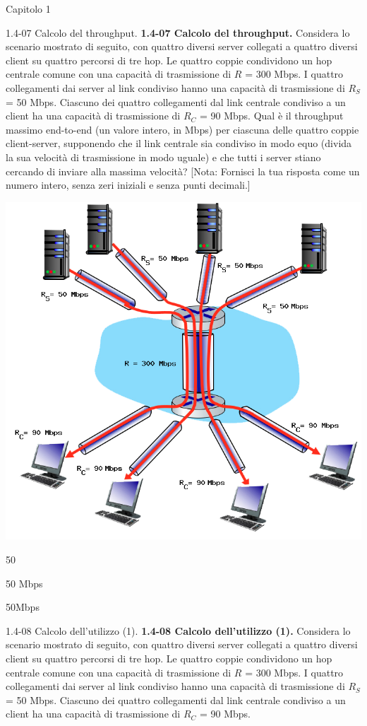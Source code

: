 \documentclass[a4paper]{article}
\begin{document}
\begin{quiz}{Capitolo 1}
\begin{shortanswer}[points=1,shuffle=true]{1.4-07 Calcolo del throughput.}
\textbf{1.4-07 Calcolo del throughput.} 
Considera lo scenario mostrato di seguito, con quattro diversi server collegati a quattro diversi client su quattro percorsi di tre hop. Le quattro coppie condividono un hop centrale comune con una capacità di trasmissione di $R$ = 300 Mbps. I quattro collegamenti dai server al link condiviso hanno una capacità di trasmissione di $R_S$ = 50 Mbps. Ciascuno dei quattro collegamenti dal link centrale condiviso a un client ha una capacità di trasmissione di $R_C$ = 90 Mbps. Qual è il throughput massimo end-to-end (un valore intero, in Mbps) per ciascuna delle quattro coppie client-server, supponendo che il link centrale sia condiviso in modo equo (divida la sua velocità di trasmissione in modo uguale) e che tutti i server stiano cercando di inviare alla massima velocità? 
[Nota: Fornisci la tua risposta come un numero intero, senza zeri iniziali e senza punti decimali.]
\begin{center}
\includegraphics[width=0.7\linewidth]{figs/1.4.7.png}
\end{center}
\item 50
\item 50 Mbps
\item 50Mbps
\end{shortanswer}

\begin{shortanswer}[points=1,shuffle=true]{1.4-08 Calcolo dell'utilizzo (1).}
\textbf{1.4-08 Calcolo dell'utilizzo (1).} 
Considera lo scenario mostrato di seguito, con quattro diversi server collegati a quattro diversi client su quattro percorsi di tre hop. Le quattro coppie condividono un hop centrale comune con una capacità di trasmissione di $R$ = 300 Mbps. I quattro collegamenti dai server al link condiviso hanno una capacità di trasmissione di $R_S$ = 50 Mbps. Ciascuno dei quattro collegamenti dal link centrale condiviso a un client ha una capacità di trasmissione di $R_C$ = 90 Mbps. 


\end{shortanswer}
\end{quiz}
\end{document}
